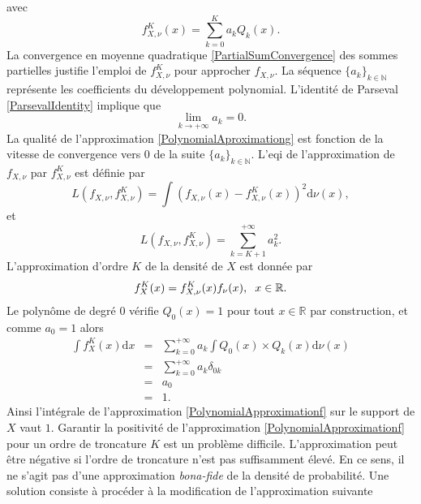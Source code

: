 avec 
\begin{equation}\label{PolynomialAproximationg}
f_{X,\nu}^{K}(x)=\sum_{k=0}^{K}a_{k}Q_{k}(x).
\end{equation}
La convergence en moyenne quadratique \eqref{PartialSumConvergence} des sommes partielles justifie l'emploi de $f_{X,\nu}^{K}$ pour approcher $f_{X,\nu}$. La séquence $\{a_{k}\}_{k\in\mathbb{N}}$ représente les coefficients du développement polynomial. L'identité de Parseval \eqref{ParsevalIdentity} implique que
\begin{equation}\label{LimitCoefficientExpansion}
\underset{k\rightarrow+\infty}{\lim} a_{k} = 0.
\end{equation} 
La qualité de l'approximation \eqref{PolynomialAproximationg} est fonction de la vitesse de convergence vers $0$ de la suite $\{a_{k}\}_{k\in\mathbb{N}}$. L'\gls{eqi} de l'approximation de $f_{X,\nu}$ par $f_{X,\nu}^{K}$ est définie par
\begin{equation}\label{QuadraticLoss}
L\left(f_{X,\nu},f_{X,\nu}^{K} \right)=\int\left(f_{X,\nu}(x)-f_{X,\nu}^{K}(x)\right)^{2}\text{d}\nu(x),
\end{equation}
et
\begin{equation}\label{ApproximationQuadraticError}
L\left(f_{X,\nu},f_{X,\nu}^{K} \right)=\sum_{k=K+1}^{+\infty}a_{k}^{2}.
\end{equation}
L'approximation d'ordre $K$ de la densité de $X$ est donnée par 
\begin{equation}\label{PolynomialApproximationf}
f_{X}^{K}(x)=f_{X,\nu}^{K}(x)f_{\nu}(x),\hspace{0.2cm}x\in\mathbb{R}.
\end{equation}
Le polynôme de degré $0$ vérifie $Q_{0}(x)=1$ pour tout $x\in\mathbb{R}$ par construction, et comme $a_{0}=1$ alors
\begin{eqnarray*}
\int f^{K}_{X}(x)\text{d}x&=&\sum_{k=0}^{+\infty}a_{k}\int Q_{0}(x)\times Q_{k}(x)\text{d}\nu(x)\\
&=&\sum_{k=0}^{+\infty}a_{k}\delta_{0k}\\
&=&a_{0}\\
&=&1.
\end{eqnarray*}
Ainsi l\rq{}intégrale de l'approximation \eqref{PolynomialApproximationf} sur le support de $X$ vaut $1$. Garantir la positivité de l'approximation \eqref{PolynomialApproximationf} pour un ordre de troncature $K$ est un problème difficile. L'approximation peut être négative si l'ordre de troncature n'est pas suffisamment élevé. En ce sens, il ne s'agit pas d'une approximation \textit{bona-fide} de la densité de probabilité. Une solution consiste à procéder à la modification de l\rq{}approximation suivante 
